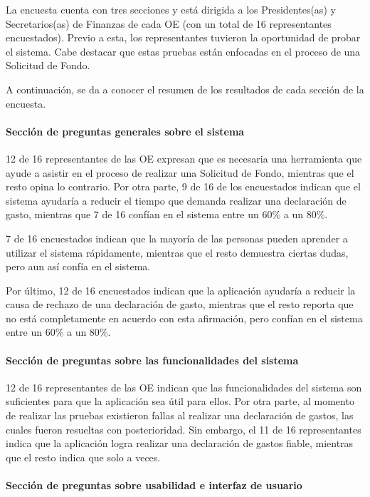 La encuesta cuenta con tres secciones y está dirigida a los Presidentes(as) y Secretarios(as) de Finanzas de cada OE (con un total de 16 representantes encuestados). Previo a esta, los representantes tuvieron la oportunidad de probar el sistema. Cabe destacar que estas pruebas están enfocadas en el proceso de una Solicitud de Fondo.

A continuación, se da a conocer el resumen de los resultados de cada sección de la encuesta.

\paragraph{Sección de preguntas generales sobre el sistema}

12 de 16 representantes de las OE expresan que es necesaria una herramienta que ayude a asistir en el proceso de realizar una Solicitud de Fondo, mientras que el resto opina lo contrario. Por otra parte, 9 de 16 de los encuestados indican que el sistema ayudaría a reducir el tiempo que demanda realizar una declaración de gasto, mientras que 7 de 16 confían en el sistema entre un 60\% a un 80\%.

7 de 16 encuestados indican que la mayoría de las personas pueden aprender a utilizar el sistema rápidamente, mientras que el resto demuestra ciertas dudas, pero aun así confía en el sistema.

Por último, 12 de 16 encuestados indican que la aplicación ayudaría a reducir la causa de rechazo de una declaración de gasto, mientras que el resto reporta que no está completamente en acuerdo con esta afirmación, pero confían en el sistema entre un 60\% a un 80\%.

\paragraph{Sección de preguntas sobre las funcionalidades del sistema}

12 de 16 representantes de las OE indican que las funcionalidades del sistema son suficientes para que la aplicación sea útil para ellos. Por otra parte, al momento de realizar las pruebas existieron fallas al realizar una declaración de gastos, las cuales fueron resueltas con posterioridad. Sin embargo, el 11 de 16 representantes indica que la aplicación logra realizar una declaración de gastos fiable, mientras que el resto indica que solo a veces.

\paragraph{Sección de preguntas sobre usabilidad e interfaz de usuario}

